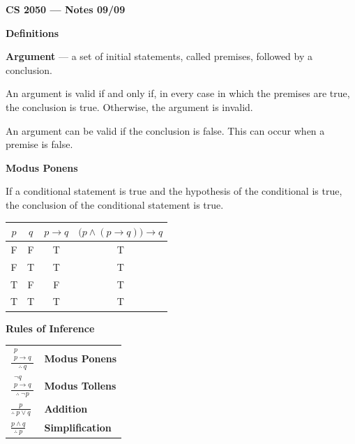 \documentclass{article}
\begin{document}
\textbf{CS 2050 --- Notes 09/09}

\bigskip

\textbf{Definitions}

\medskip

\textbf{Argument} --- a set of initial statements, called premises, followed by a conclusion.

\medskip

An argument is valid if and only if, in every case in which the premises are true, the conclusion is true. Otherwise, the argument is invalid.

\medskip

An argument can be valid if the conclusion is false. This can occur when a premise is false.

\bigskip

\textbf{Modus Ponens}

\medskip

If a conditional statement is true and the hypothesis of the conditional is true, the conclusion of the conditional statement is true.

\medskip

\begin{center}
\begin{tabular}{cc|c|c}
$p$ & $q$ & $p \to q$ & $\bigl(p \land (p \to q)\bigr) \to q$ \\
\hline
F & F & T & T \\
F & T & T & T \\
T & F & F & T \\
T & T & T & T
\end{tabular}
\end{center}

\bigskip

\textbf{Rules of Inference}

\medskip

\begin{center}
\begin{tabular}{@{}p{}l@{}}
$\displaystyle \frac{\begin{gathered}p\\p \to q\end{gathered}}{\therefore\ q}$ & \textbf{Modus Ponens} \\[1.3em]
$\displaystyle \frac{\begin{gathered}\lnot q\\p \to q\end{gathered}}{\therefore\ \lnot p}$ & \textbf{Modus Tollens} \\[1.3em]
$\displaystyle \frac{p}{\therefore\ p \lor q}$ & \textbf{Addition} \\[1.3em]
$\displaystyle \frac{p \land q}{\therefore\ p}$ & \textbf{Simplification}
\end{tabular}
\end{center}
\end{document}
